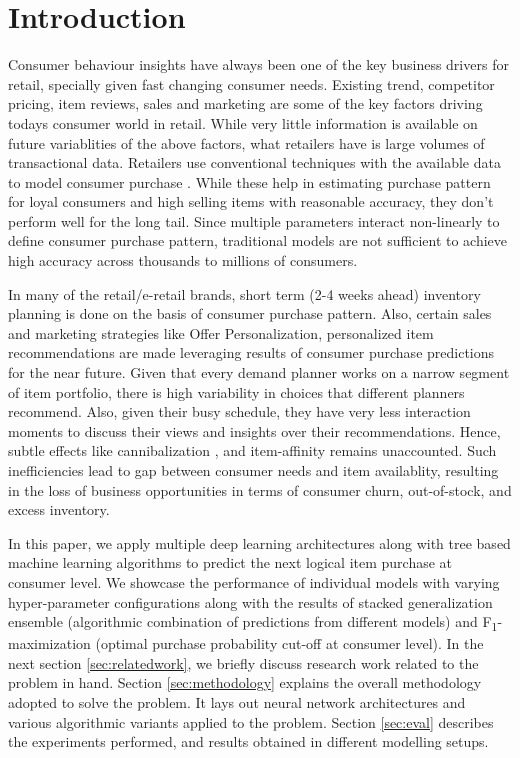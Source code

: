 \section{Introduction}
Consumer behaviour insights have always been one of the key business drivers for retail, specially given
fast changing consumer needs. Existing trend, competitor pricing, item reviews, sales and marketing are some of the 
key factors driving todays consumer world in retail. While very little information is available
on future variablities of the above factors, what retailers have is large volumes of transactional data.
Retailers use conventional techniques with the available data to model consumer purchase \cite{choudhury2019machine}. 
While these help in estimating purchase pattern for loyal consumers and high selling items with reasonable accuracy, they 
don't perform well for the long tail. Since multiple parameters interact non-linearly to define consumer purchase pattern,
traditional models are not sufficient to achieve high accuracy across thousands to millions of consumers.

In many of the retail/e-retail brands, short term (2-4 weeks ahead) inventory planning is done on the basis of consumer 
purchase pattern. Also, certain sales and marketing strategies like Offer Personalization, personalized item
recommendations are made leveraging results of consumer purchase predictions for the near future.
Given that every demand planner works on a narrow segment of item portfolio, there is high 
variability in choices that different planners recommend. Also, given their busy schedule, they have very less interaction
moments to discuss their views and insights over their recommendations. Hence, subtle effects like cannibalization
\cite{shah2007retailer}, and item-affinity remains unaccounted. Such inefficiencies lead to gap between consumer needs 
and item availablity, resulting in the loss of business opportunities in terms of consumer churn, out-of-stock, 
and excess inventory.

In this paper, we apply multiple deep learning architectures along with tree based machine learning algorithms
to predict the next logical item purchase at consumer level. We showcase the performance of individual models with 
varying hyper-parameter configurations along with the results of stacked generalization ensemble \cite{wolpert1992stacked} 
(algorithmic combination of predictions from different models) and F\textsubscript{1}-maximization (optimal purchase 
probability cut-off at consumer level).
In the next section \ref{sec:relatedwork}, we briefly discuss research work related to the problem in hand. 
Section \ref{sec:methodology} explains the overall methodology adopted to solve the problem.
It lays out neural network architectures and various algorithmic variants applied to the problem.
Section \ref{sec:eval} describes the experiments performed, and results obtained in different modelling setups.
